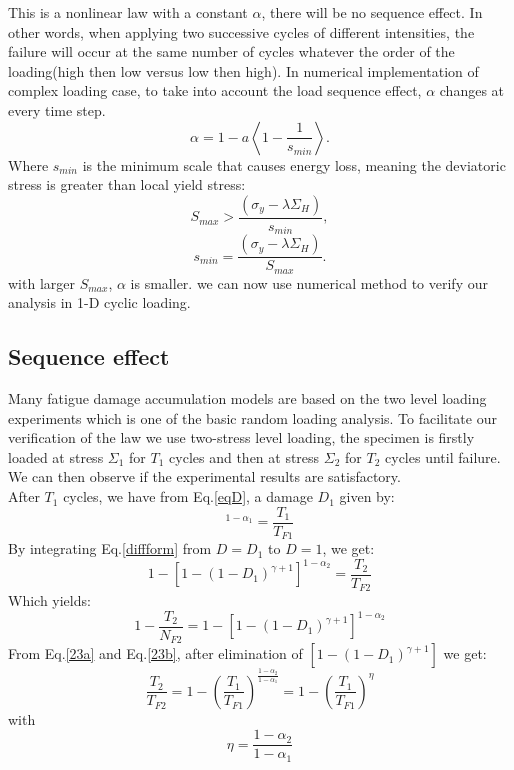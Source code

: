 \documentclass[3p,times,number,review]{elsarticle}
\begin{document}
This is a nonlinear law with a constant $\alpha$, there will be no sequence effect. In other words,
when applying two successive cycles of different intensities, the failure will occur at the same number of cycles whatever the order of the loading(high then low versus low then high). In numerical implementation of complex loading case, to take into account the load sequence effect, $\alpha$ changes at every time step.
\begin{equation}
\alpha=1-a\left<1-\dfrac{1}{s_{min}} \right>  .
\label{alpha}
\end{equation}
Where $s_{min}$ is the minimum scale that causes energy loss, meaning the deviatoric stress is greater than local yield stress: $$S_{max}>\dfrac{\left(\sigma_y-\lambda \Sigma_H\right)}{s_{min}},$$
$$s_{min}=\dfrac{\left(\sigma_y-\lambda \Sigma_H\right)}{S_{max}}.$$
with larger $S_{max}$, $\alpha$ is smaller. we can now use numerical method to verify our analysis in 1-D cyclic loading.

\subsection{Sequence effect}

Many fatigue damage accumulation models are based on the two level loading experiments which is one of the basic random loading analysis. To facilitate our verification of the law we use two-stress level loading, the specimen is firstly loaded at stress $\Sigma_1$ for $T_1$ cycles and then at stress $\Sigma_2$ for $T_2$ cycles until failure. We can then observe if the experimental results are satisfactory.\\
After $T_1$ cycles, we have from Eq.\eqref{eqD}, a damage $D_1$ given by:
\begin{equation}
[1-(1-D_1)^{\gamma+1}]^{1-\alpha_1}=\dfrac{T_1}{T_{F1}}
\label{23a}
\end{equation}
By integrating Eq.\eqref{diffform} from $D=D_1$ to $D=1$, we get:
\begin{equation}
1-[1-(1-D_1)^{\gamma+1}]^{1-\alpha_2}=\dfrac{T_2}{T_{F2}}
\end{equation}
Which yields:
\begin{equation}1-\dfrac{T_2}{N_{F2}}=1-[1-(1-D_1)^{\gamma+1}]^{1-\alpha_2}
\label{23b}
\end{equation}
From Eq.\eqref{23a} and Eq.\eqref{23b}, after elimination of $[1-(1-D_1)^{\gamma+1}]$ we get:
\begin{equation} 
\dfrac{T_2}{T_{F2}}=1-\left( \dfrac{T_1}{T_{F1}}\right) ^\frac{1-\alpha_2}{1-\alpha_1}=1-\left( \dfrac{T_1}{T_{F1}}\right) ^\eta
\end{equation}
with
\begin{equation}\eta=\dfrac{1-\alpha_2}{1-\alpha_1}
\label{eta}
\end{equation}
\end{document}
